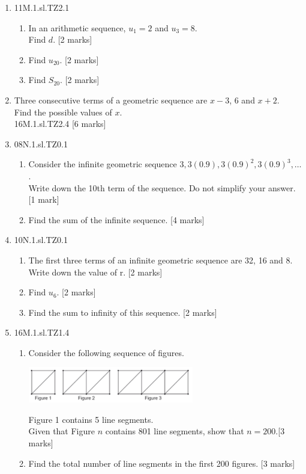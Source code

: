 \documentclass[12pt, twoside]{article}
\begin{document}
\begin{enumerate}
  \item 11M.1.sl.TZ2.1
  \begin{enumerate}
    \item In an arithmetic sequence, $u_1=2$ and $u_3=8$.\\
    Find $d$. [2 marks]
    \item Find $u_{20}$. [2 marks]
    \item Find $S_{20}$. [2 marks]
  \end{enumerate}

  \item Three consecutive terms of a geometric sequence are $x-3$, $6$ and $x+2$.\\
  Find the possible values of $x$.\\
  16M.1.sl.TZ2.4  [6 marks]

  \item 08N.1.sl.TZ0.1
  \begin{enumerate}
    \item Consider the infinite geometric sequence $3, 3(0.9), 3(0.9)^2, 3(0.9)^3,\dots$.\\
    Write down the 10th term of the sequence. Do not simplify your answer. [1 mark]
    \item Find the sum of the infinite sequence. [4 marks]
  \end{enumerate}

  \item 10N.1.sl.TZ0.1
  \begin{enumerate}
    \item The first three terms of an infinite geometric sequence are 32, 16 and 8.\\
    Write down the value of r. [2 marks]
    \item Find $u_6$. [2 marks]
    \item Find the sum to infinity of this sequence. [2 marks]
  \end{enumerate}

  \item 16M.1.sl.TZ1.4
  \begin{enumerate}
    \item Consider the following sequence of figures.
    \begin{center}
      \includegraphics[width=0.6\textwidth]{1-1-P1_Algebra-8.png}
    \end{center}
    Figure 1 contains 5 line segments.\\
    Given that Figure $n$ contains 801 line segments, show that $n=200$.[3 marks]
    \item Find the total number of line segments in the first 200 figures. [3 marks]
  \end{enumerate}


\end{enumerate}
\end{document}
